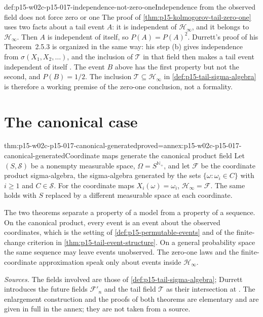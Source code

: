 \begin{hbwarning}{def:p15-w02c-p15-017-independence-not-zero-one}{Independence from the observed field does not force zero or one}
The proof of \cref{thm:p15-kolmogorov-tail-zero-one} uses two facts
about a tail event \(A\): it is independent of \(\mathcal H_\infty\),
and it belongs to \(\mathcal H_\infty\). Then \(A\) is independent of
itself, so \(P(A)=P(A)^2\). Durrett's proof of his Theorem~2.5.3 is
organized in the same way: his step (b) gives independence from
\(\sigma(X_1,X_2,\ldots)\), and the inclusion of \(\mathcal T\) in that
field then makes a tail event independent of itself
\cite[pp.~81--82]{DurrettPTEAuthor2019}.
The event \(B\) above has the first property
but not the second, and \(P(B)=1/2\). The inclusion
\(\mathcal T\subseteq\mathcal H_\infty\) in
\cref{def:p15-tail-sigma-algebra} is therefore a working premise of the
zero-one conclusion, not a formality.
\end{hbwarning}

\section{The canonical case}
\label{sec:p15-w02c-p15-017-canonical}

\begin{hbtheorem}{thm:p15-w02c-p15-017-canonical-generated}{proved=annex:p15-w02c-p15-017-canonical-generated}{Coordinate maps generate the canonical product field}
Let \((S,\mathcal S)\) be a nonempty measurable space,
\(\Omega=S^{\mathbb N_+}\), and let \(\mathcal F\) be the coordinate
product sigma-algebra, the sigma-algebra generated by the sets
\(\{\omega:\omega_i\in C\}\) with \(i\geq1\) and \(C\in\mathcal S\).
For the coordinate maps \(X_i(\omega)=\omega_i\),
\(\mathcal H_\infty=\mathcal F\).
The same holds with \(S\) replaced by a different measurable space at
each coordinate.
\end{hbtheorem}

The two theorems separate a property of a model from a property of a
sequence. On the canonical product, every event is an event about the
observed coordinates, which is the setting of
\cref{def:p15-permutable-events} and of the finite-change criterion in
\cref{thm:p15-tail-event-structure}. On a general probability space the
same sequence may leave events unobserved. The zero-one laws and the
finite-coordinate approximation speak only about events inside
\(\mathcal H_\infty\).

\emph{Sources.} The fields involved are those of
\cref{def:p15-tail-sigma-algebra}; Durrett introduces the future fields
\(\mathcal F'_n\) and the tail field \(\mathcal T\) as their intersection
at \cite[p.~81]{DurrettPTEAuthor2019}. The enlargement construction and
the proofs of both theorems are elementary and are given in full in the
annex; they are not taken from a source.
